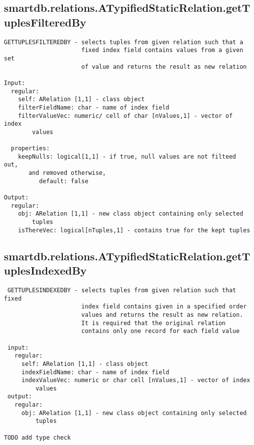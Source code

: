 \subsection{\texorpdfstring{smartdb.relations.ATypifiedStaticRelation.getTuplesFilteredBy}{getTuplesFilteredBy}}\label{method:smartdb.relations.ATypifiedStaticRelation.getTuplesFilteredBy}
\begin{verbatim}
GETTUPLESFILTEREDBY - selects tuples from given relation such that a
                      fixed index field contains values from a given set
                      of value and returns the result as new relation

Input:
  regular:
    self: ARelation [1,1] - class object
    filterFieldName: char - name of index field
    filterValueVec: numeric/ cell of char [nValues,1] - vector of index
        values

  properties:
    keepNulls: logical[1,1] - if true, null values are not filteed out,
       and removed otherwise,
          default: false

Output:
  regular:
    obj: ARelation [1,1] - new class object containing only selected
        tuples
    isThereVec: logical[nTuples,1] - contains true for the kept tuples
\end{verbatim}
\subsection{\texorpdfstring{smartdb.relations.ATypifiedStaticRelation.getTuplesIndexedBy}{getTuplesIndexedBy}}\label{method:smartdb.relations.ATypifiedStaticRelation.getTuplesIndexedBy}
\begin{verbatim}
 GETTUPLESINDEXEDBY - selects tuples from given relation such that fixed
                      index field contains given in a specified order
                      values and returns the result as new relation.
                      It is required that the original relation
                      contains only one record for each field value

 input:
   regular:
     self: ARelation [1,1] - class object
     indexFieldName: char - name of index field
     indexValueVec: numeric or char cell [nValues,1] - vector of index
         values
 output:
   regular:
     obj: ARelation [1,1] - new class object containing only selected
         tuples

TODO add type check
\end{verbatim}
